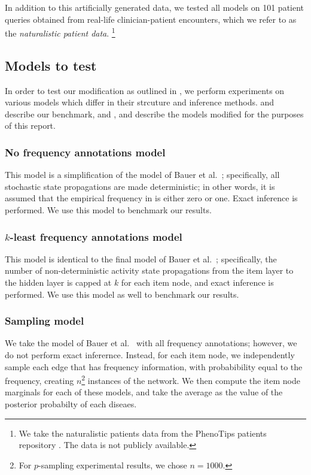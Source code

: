 In addition to this artificially generated data, we tested all models
on 101 patient queries obtained from real-life clinician-patient
encounters, which we refer to as the {\it naturalistic patient data}.
%
\footnote{
    We take the naturalistic patients data from the PhenoTips patients
    repository \cite{phenotips}.
    The data is not publicly available.
}

\subsection{Models to test}
%
In order to test our modification as outlined in ,
we perform experiments on various models which differ in their strcuture and
inference methods.
%
 and 
 describe our benchmark, and
, 
 and 
 describe the models modified for the purposes
of this report.

\subsubsection{No frequency annotations model}
\label{subsubsec:nofreqmodel}
%
This model is a simplification of the model of Bauer et al.\
\cite{bauer2012bayesian}; specifically, all stochastic state propagations are
made deterministic; in other words, it is assumed that the empirical frequency
in 
 is either zero or one.
%
Exact inference is performed.
%
We use this model to benchmark our results.

\subsubsection{$k$-least frequency annotations model}
\label{subsubsec:kleastmodel}
%
This model is identical to the final model of Bauer et al.\
\cite{bauer2012bayesian}; specifically, the number of non-deterministic activity
state propagations from the item layer to the hidden layer is capped at $k$ for
each item node, and exact inference is performed.
%
We use this model as well to benchmark our results.

\subsubsection{Sampling model}
\label{subsubsec:sampmodel}
%
We take the model of Bauer et al.\ \cite{bauer2012bayesian} with all frequency
annotations; however, we do not perform exact inferernce.
%
Instead, for each item node, we independently sample each edge that has frequency
information, with probabibility equal to the frequency, creating $n$\footnote{
    For $p$-sampling experimental results, we chose $n=1000$.
} instances of the network.
%
We then compute the item node marginals for each of these models, and take
the average as the value of the posterior probabilty of each diseaes. 

